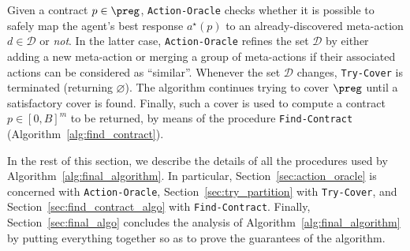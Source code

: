 %
Given a contract $p \in \preg$, \texttt{Action-Oracle} checks whether it is possible to safely map the agent's best response $a^\star(p)$ to an already-discovered meta-action $d \in \mathcal{D}$ or \emph{not}.
%
In the latter case, \texttt{Action-Oracle} refines the set $\mathcal{D}$ by either adding a new meta-action or merging a group of meta-actions if their associated actions can be considered as ``similar''.
%
Whenever the set $\mathcal{D}$ changes, \texttt{Try-Cover} is terminated (returning $\varnothing$).
%
The algorithm continues trying to cover $\preg$ until a satisfactory cover is found.
%
Finally, such a cover is used to compute a contract $p \in [0,B]^m$ to be returned, by means of the procedure \texttt{Find-Contract} (Algorithm~\ref{alg:find_contract}).
%
%


In the rest of this section, we describe the details of all the procedures used by Algorithm~\ref{alg:final_algorithm}.
%
In particular, Section~\ref{sec:action_oracle} is concerned with \texttt{Action-Oracle}, Section~\ref{sec:try_partition} with \texttt{Try-Cover}, and Section~\ref{sec:find_contract_algo} with \texttt{Find-Contract}.
%
Finally, Section~\ref{sec:final_algo} concludes the analysis of Algorithm~\ref{alg:final_algorithm} by putting everything together so as to prove the guarantees of the algorithm.
%

